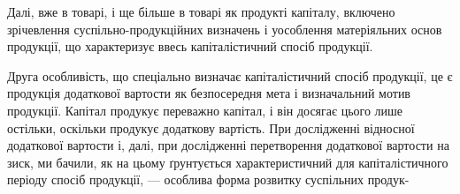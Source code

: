 Далі, вже в товарі, і ще більше в товарі як продукті капіталу, включено
зрічевлення суспільно-продукційних визначень і уособлення матеріяльних
основ продукції, що характеризує ввесь капіталістичний спосіб продукції.

Друга особливість, що спеціально визначає капіталістичний спосіб продукції,
це є продукція додаткової вартости як безпосередня мета і визначальний
мотив продукції. Капітал продукує переважно капітал, і він досягає цього
лише остільки, оскільки продукує додаткову вартість. При дослідженні відносної
додаткової вартости і, далі, при дослідженні перетворення додаткової вартости
на зиск, ми бачили, як на цьому ґрунтується характеристичний для капіталістичного
періоду спосіб продукції, — особлива форма розвитку суспільних продук-
